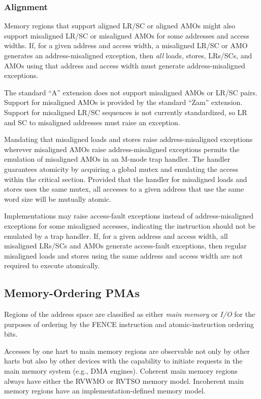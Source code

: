 \subsubsection{Alignment}

Memory regions that support aligned LR/SC or aligned AMOs might also support
misaligned LR/SC or misaligned AMOs for some addresses and access widths.  If,
for a given address and access width, a misaligned LR/SC or AMO generates
an address-misaligned exception, then {\em all} loads, stores, LRs/SCs, and
AMOs using that address and access width must generate address-misaligned
exceptions.
\begin{commentary}
The standard ``A'' extension does not support misaligned AMOs or LR/SC pairs.
Support for misaligned AMOs is provided by the standard ``Zam'' extension.
Support for misaligned LR/SC sequences is not currently standardized,
so LR and SC to misaligned addresses must raise an exception.

Mandating that misaligned loads and stores raise address-misaligned exceptions
wherever misaligned AMOs raise address-misaligned exceptions permits the
emulation of misaligned AMOs in an M-mode trap handler.  The handler
guarantees atomicity by acquiring a global mutex and emulating the access
within the critical section.  Provided that the handler for misaligned loads
and stores uses the same mutex, all accesses to a given address that use the
same word size will be mutually atomic.
\end{commentary}

Implementations may raise access-fault exceptions instead of address-misaligned
exceptions for some misaligned accesses, indicating the instruction should not
be emulated by a trap handler.  If, for a given address and access width, all
misaligned LRs/SCs and AMOs generate access-fault exceptions, then regular
misaligned loads and stores using the same address and access width are not
required to execute atomically.

\subsection{Memory-Ordering PMAs}

Regions of the address space are classified as either {\em main
  memory} or {\em I/O} for the purposes of ordering by the FENCE
instruction and atomic-instruction ordering bits.

Accesses by one hart to main memory regions are observable not only by
other harts but also by other devices with the capability to initiate
requests in the main memory system (e.g., DMA engines).
Coherent main memory regions always have either the RVWMO or RVTSO memory
model.
Incoherent main memory regions have an implementation-defined memory model.

